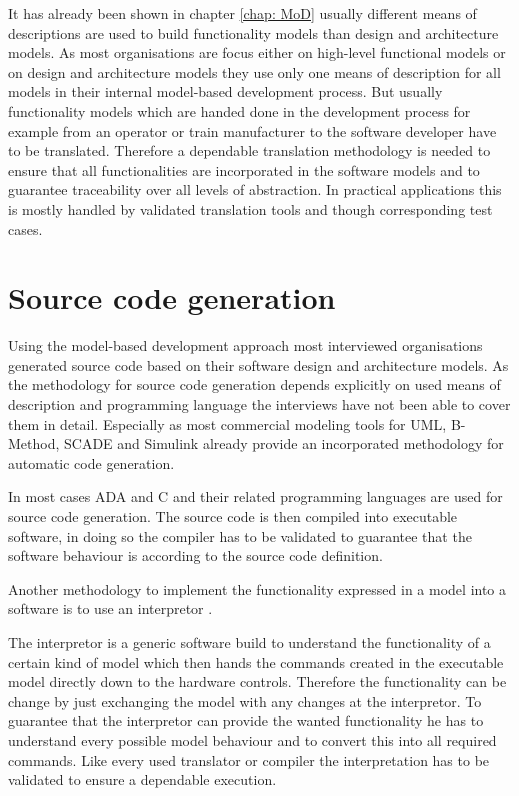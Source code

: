 \documentclass{./template/openetcs_report}
\begin{document}
It has already been shown in chapter \ref{chap: MoD} usually different means of descriptions are used to build functionality models than design and architecture models. As most organisations are focus either on high-level functional models or on design and architecture models they use only one means of description for all models in their internal model-based development process. But usually functionality models which are handed done in the development process for example from an operator or train manufacturer to the software developer have to be translated. Therefore a dependable translation methodology is needed to ensure that all functionalities are incorporated in the software models and to guarantee traceability over all levels of abstraction. In practical applications this is mostly handled by validated translation tools and though corresponding test cases.

\section{Source code generation}

Using the model-based development approach most interviewed organisations generated source code based on their software design and architecture models. As the  methodology for source code generation depends explicitly on used means of description and programming language the interviews have not been able to cover them in detail. Especially as most commercial modeling tools for UML, B-Method, SCADE and Simulink already provide an incorporated methodology for automatic code generation. 

In most cases ADA and C and their related programming languages are used for source code generation. The source code is then compiled into executable software, in doing so the compiler has to be validated to guarantee that the software behaviour is according to the source code definition.

Another methodology to implement the functionality expressed in a model into a software is to use an interpretor .

The interpretor is a generic software build to understand the functionality of a certain kind of model which then hands the commands created in the executable model directly down to the hardware controls. Therefore the functionality can be change by just exchanging the model with any changes at the interpretor. To guarantee that the interpretor can provide the wanted functionality he has to understand every possible model behaviour and to convert this into all required commands. Like every used translator or compiler the interpretation has to be validated to ensure a dependable execution.
\end{document}
